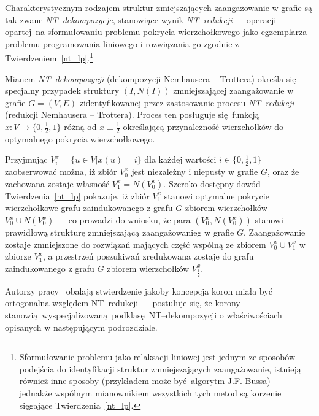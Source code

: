 \par{
  Charakterystycznym rodzajem struktur zmiejszających zaangażowanie w grafie są tak zwane \emph{NT--dekompozycje}, stanowiące wynik \emph{NT--redukcji} --- operacji opartej na sformułowaniu problemu pokrycia wierzchołkowego jako egzemplarza problemu programowania liniowego i rozwiązania go zgodnie z Twierdzeniem~\ref{nt_lp}.\footnote{Sformułowanie problemu jako relaksacji liniowej jest jednym ze sposobów podejścia do identyfikacji struktur zmniejszających zaangażowanie, istnieją również inne sposoby (przykładem może być algorytm J.F. Bussa) --- jednakże wspólnym mianownikiem wszystkich tych metod są korzenie sięgające Twierdzenia~\ref{nt_lp}.}
  \begin{definition}
    Mianem \emph{NT--dekompozycji} (dekompozycji Nemhausera -- Trottera) określa się specjalny przypadek struktury $(I, N(I))$ zmniejszającej zaangażowanie w grafie $G=(V, E)$ zidentyfikowanej przez zastosowanie procesu \emph{NT--redukcji} (redukcji Nemhausera -- Trottera).
    Proces ten posługuje się funkcją $x: V \rightarrow \{0, \frac{1}{2}, 1\}$ różną od $x \equiv \frac{1}{2}$ określającą przynależność wierzchołków do optymalnego pokrycia wierzchołkowego.
  \end{definition}
  Przyjmując $V_i^x=\{u \in V| x(u)=i\}$ dla każdej wartości $i\in \{0, \frac{1}{2}, 1\}$ zaobserwować można, iż zbiór $V_0^x$ jest niezależny i niepusty w grafie $G$, oraz że zachowana zostaje własność $V_1^x = N(V_0^x)$.
  Szeroko dostępny dowód Twierdzenia~\ref{nt_lp} pokazuje, iż zbiór $V_1^x$ stanowi optymalne pokrycie wierzchołkowe grafu zaindukowanego z grafu $G$ zbiorem wierzchołków $V_0^x \cup N(V_0^x)$ --- co prowadzi do wniosku, że para $(V_0^x, N(V_0^x))$ stanowi prawidłową strukturę zmniejszającą zaangażowanieg w grafie $G$.
  Zaangażowanie zostaje zmniejszone do rozwiązań mających część wspólną ze zbiorem $V_0^x \cup V_1^x$ w zbiorze $V_1^x$, a przestrzeń poszukiwań zredukowana zostaje do grafu zaindukowanego z grafu $G$ zbiorem wierzchołków $V_\frac{1}{2}^x$.
}
\par{
  Autorzy pracy~\cite{chlebik:crown} obalają stwierdzenie jakoby koncepcja koron miała być ortogonalna względem NT--redukcji --- postuluje się, że korony stanowią wyspecjalizowaną podklasę NT--dekompozycji o właściwościach opisanych w następującym podrozdziale.
}
